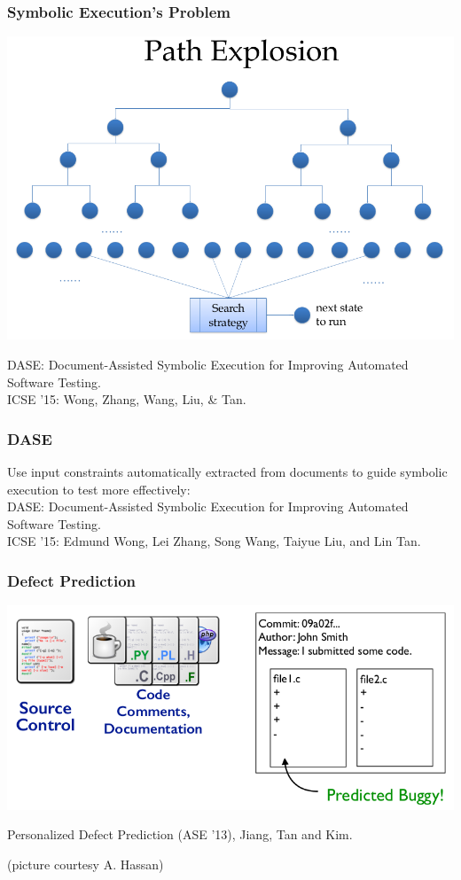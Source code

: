 \documentclass{beamer}
\newenvironment{changemargin}[1]{%
  \begin{list}{}{%
    \setlength{\topsep}{0pt}%
    \setlength{\leftmargin}{#1}%
    \setlength{\rightmargin}{1em}
    \setlength{\listparindent}{\parindent}%
    \setlength{\itemindent}{\parindent}%
    \setlength{\parsep}{\parskip}%
  }%
  \item[]}{\end{list}}
\begin{document}
\begin{frame}[fragile]
  \frametitle{Symbolic Execution's Problem}
  \includegraphics[width=.9\textwidth]{L11/dase2.png}
  \scriptsize
  \begin{center}
  DASE: Document-Assisted Symbolic Execution for Improving Automated Software Testing.\\
  ICSE '15: Wong, Zhang, Wang, Liu, \& Tan.
  \end{center}
\end{frame}

\begin{frame}[fragile]
  \frametitle{DASE}
  \begin{changemargin}{1.5cm}
  Use input constraints automatically extracted from documents to guide symbolic
  execution to test more effectively:\\[2em]
  DASE: Document-Assisted Symbolic Execution for Improving Automated Software Testing.\\
  ICSE '15: Edmund Wong, Lei Zhang, Song Wang, Taiyue Liu, and Lin Tan.
  \end{changemargin}
\end{frame}


\begin{frame}
  \frametitle{Defect Prediction}

  \begin{center}
    \includegraphics[width=.8\textwidth]{L11/defect-prediction}
  \end{center}

  \begin{center}
  Personalized Defect Prediction (ASE '13), Jiang, Tan and Kim.
  \end{center}
  \hfill (picture courtesy A. Hassan)
\end{frame}
\end{document}
